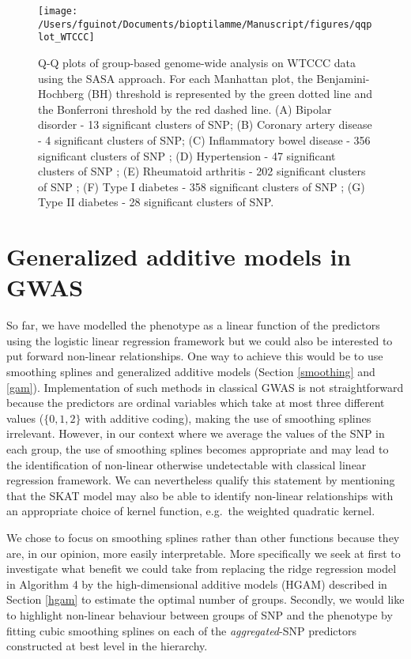 \documentclass[]{book}
\begin{document}
\begin{figure}

{\centering \texttt{[image: /Users/fguinot/Documents/bioptilamme/Manuscript/figures/qqplot\_WTCCC]} 

}

\caption{Q-Q plots of group-based genome-wide analysis on WTCCC data using the SASA approach. For each Manhattan plot, the Benjamini-Hochberg (BH) threshold is represented by the green dotted line and the Bonferroni threshold by the red dashed line. (A) Bipolar disorder - 13 significant clusters of SNP; (B) Coronary artery disease - 4 significant clusters of SNP; (C) Inflammatory bowel disease - 356 significant clusters of SNP ; (D) Hypertension - 47 significant clusters of SNP ; (E) Rheumatoid arthritis - 202 significant clusters of SNP ; (F) Type I diabetes - 358 significant clusters of SNP ; (G) Type II diabetes - 28 significant clusters of SNP.}\label{fig:qqplotWTCCC}
\end{figure}

\hypertarget{leosgam}{%
\section{Generalized additive models in GWAS}\label{leosgam}}

So far, we have modelled the phenotype as a linear function of the
predictors using the logistic linear regression framework but we could
also be interested to put forward non-linear relationships. One way to
achieve this would be to use smoothing splines and generalized additive
models (Section \ref{smoothing} and \ref{gam}). Implementation of
such methods in classical GWAS is not straightforward because the
predictors are ordinal variables which take at most three different
values (\(\lbrace 0,1,2 \rbrace\) with additive coding), making the use
of smoothing splines irrelevant. However, in our context where we
average the values of the SNP in each group, the use of smoothing
splines becomes appropriate and may lead to the identification of
non-linear otherwise undetectable with classical linear regression
framework. We can nevertheless qualify this statement by mentioning that
the SKAT model may also be able to identify non-linear relationships
with an appropriate choice of kernel function, e.g.~the weighted
quadratic kernel.

We chose to focus on smoothing splines rather than other functions
because they are, in our opinion, more easily interpretable. More
specifically we seek at first to investigate what benefit we could take
from replacing the ridge regression model in Algorithm 4 by the high-dimensional additive models (HGAM)
described in Section \ref{hgam} to estimate the optimal number of
groups. Secondly, we would like to highlight non-linear behaviour
between groups of SNP and the phenotype by fitting cubic smoothing
splines on each of the \emph{aggregated}-SNP predictors constructed at best
level in the hierarchy.
\end{document}

